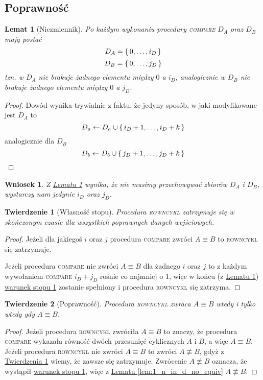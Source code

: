 \documentclass{scrartcl}
\theoremstyle{definition}
\theoremstyle{plain}
\theoremstyle{remark}
\theoremstyle{plain}
\newtheorem{lemma_niezmiennik}[lemma_equiv_if_lex_min_eq]{Lemat}
\newtheorem{not_storing_sets}{Wniosek}[section]
\newtheorem{termination_theorem}{Twierdzenie}[section]
\newtheorem{correctness_theorem}[termination_theorem]{Twierdzenie}
\theoremstyle{definition}
\theoremstyle{plain}
\begin{document}
\subsection{Poprawność}
\begin{lemma_niezmiennik}[Niezmiennik]
	\label{lem:niezmiennik}
	Po każdym wykonaniu procedury \textnormal{\textsc{compare}}
	\(D_A\) oraz \(D_B\) mają postać
	\[D_A=\set{0,\dots,i_D}\]
	\[D_B=\set{0,\dots,j_D}\]
	tzn. w \(D_A\) nie brakuje żadnego elementu
	między \(0\) a \(i_D\), analogicznie w \(D_B\)
	nie brakuje
	żadnego elementu między \(0\) a \(j_D\).
\end{lemma_niezmiennik}
\begin{proof}
	Dowód wynika trywialnie z faktu, że
	jedyny sposób, w jaki modyfikowane jest \(D_A\)
	to \[D_a\gets D_a\cup\set{i_D+1,\dots,i_D+k}\]
	analogicznie dla \(D_B\)
	\[D_b\gets D_b\cup\set{j_D+1,\dots,j_D+k}\]
\end{proof}
\begin{not_storing_sets}
	\label{cor:not_storing_sets}
	Z \hyperref[lem:niezmiennik]{Lematu \ref*{lem:niezmiennik}}
	wynika, że nie musimy przechowywać zbiorów \(D_A\) i \(D_B\),
	wystarczy nam jedynie \(i_D\) oraz \(j_D\).
\end{not_storing_sets}
\begin{termination_theorem}[Własność stopu]
	\label{thm:termination}
	Procedura \textnormal{\textsc{rowncykl}}
	zatrzymuje się w skończonym czasie dla wszystkich
	poprawnych danych wejściowych.
\end{termination_theorem}
\begin{proof}
	Jeżeli dla jakiegoś \(i\) oraz \(j\) procedura
	\textsc{compare} zwróci \(A\equiv B\) to
	\textsc{rowncykl} się zatrzymuje.

	Jeżeli procedura \textsc{compare} nie zwróci \(A\equiv B\)
	dla żadnego \(i\) oraz \(j\) to z każdym wywołaniem
	\textsc{compare} \(i_D+j_D\) rośnie co najmniej o \(1\),
	więc w końcu
	(z \hyperref[lem:niezmiennik]{Lematu \ref*{lem:niezmiennik}})
	\hyperref[term_cond_1]{warunek stopu 1}
	zostanie spełniony i procedura
	\textsc{rowncykl} się zatrzyma.
\end{proof}
\begin{correctness_theorem}[Poprawność]
	\label{thm:correctness}
	Procedura \textnormal{\textsc{rowncykl}}
	zwraca \(A\equiv B\) wtedy i tylko wtedy
	gdy \(A\equiv B\).
\end{correctness_theorem}
\begin{proof}
	Jeżeli procedura \textsc{rowncykl} zwróciła \(A\equiv B\)
	to znaczy, że procedura \textsc{compare}
	wykazała równość dwóch przesunięć cyklicznych \(A\) i \(B\),
	a więc \(A\equiv B\).
	Jeżeli procedura \textsc{rowncykl} nie zwróci \(A\equiv B\)
	to zwróci \(A\not\equiv B\), gdyż z
	\hyperref[thm:termination]{Twierdzenia \ref*{thm:termination}}
	wiemy, że zawsze się zatrzymuje.
	Zwrócenie \(A\not\equiv B\) oznacza, że wystąpił
	\hyperref[term_cond_1]{warunek stopu 1},
	więc z \hyperref[lem:1_n_in_d_no_equiv]
	{Lematu \ref*{lem:1_n_in_d_no_equiv}} \(A\not\equiv B\).
\end{proof}
\pagebreak
\end{document}
